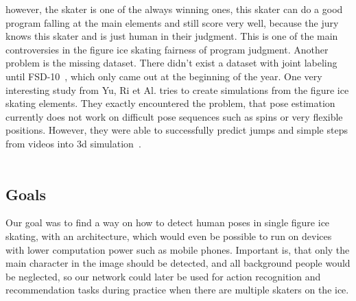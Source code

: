    however, the skater is one of the always winning
    ones, this skater can do a good program falling at the main elements and still score very well, because the
    jury knows this skater and is just human in
    their judgment.
    This is one of the main controversies in the figure ice skating fairness of program judgment.
    Another problem is the missing dataset.
    There didn't exist a dataset with joint labeling until FSD-10~\cite{fsd10}, which only came out at the
    beginning of the year.
    One very interesting study from Yu, Ri et Al. tries to create simulations from the figure ice skating elements.
    They exactly encountered the problem, that pose estimation currently does not work on difficult pose sequences
    such as spins or very flexible positions.
    However, they were able to successfully predict jumps and simple steps from videos into 3d
    simulation~\cite{simplebaselines}.
\\\mbox{}\\
    \subsection*{Goals}
    Our goal was to find a way on how to detect human poses in single figure ice skating, with an architecture, which would even
    be possible to run on devices with lower computation power such as mobile phones.
    Important is, that only the main character in the image should be detected, and all background people would be
    neglected, so our network could later be used for action recognition and recommendation tasks during practice when
    there are multiple skaters on the ice.
\\\mbox{}\\
